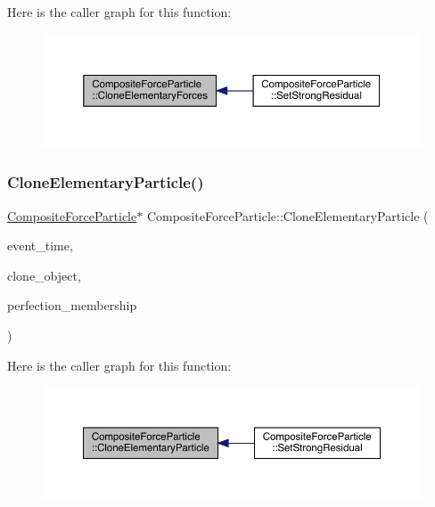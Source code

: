 Here is the caller graph for this function\+:\nopagebreak
\begin{figure}[H]
\begin{center}
\leavevmode
\includegraphics[width=350pt]{class_composite_force_particle_a2e620a92eaca67dbb482a7fd8e248f7b_icgraph}
\end{center}
\end{figure}
\mbox{\label{class_composite_force_particle_a559031016355b79ee795e621fdbbdb13}} 
\subsubsection{\texorpdfstring{Clone\+Elementary\+Particle()}{CloneElementaryParticle()}}
{\footnotesize\ttfamily \hyperlink{class_composite_force_particle}{Composite\+Force\+Particle}$\ast$ Composite\+Force\+Particle\+::\+Clone\+Elementary\+Particle (\begin{DoxyParamCaption}\item[{std\+::chrono\+::time\+\_\+point$<$ \hyperlink{universe_8h_a0ef8d951d1ca5ab3cfaf7ab4c7a6fd80}{Clock} $>$}]{event\+\_\+time,  }\item[{\hyperlink{class_composite_force_particle}{Composite\+Force\+Particle} $\ast$}]{clone\+\_\+object,  }\item[{double}]{perfection\+\_\+membership }\end{DoxyParamCaption})}

Here is the caller graph for this function\+:\nopagebreak
\begin{figure}[H]
\begin{center}
\leavevmode
\includegraphics[width=350pt]{class_composite_force_particle_a559031016355b79ee795e621fdbbdb13_icgraph}
\end{center}
\end{figure}
\mbox{\label{class_composite_force_particle_ac27e6d3bb56272728a8c197dbcd2db4e}} 
